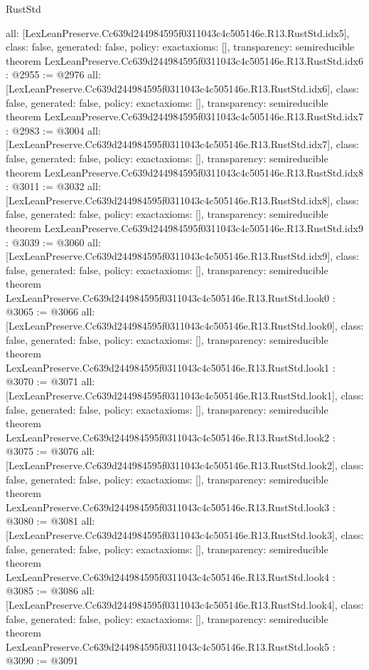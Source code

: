 \begin{lexlean}{RustStd}
\begin{coremodule}
{  all: [LexLeanPreserve.Cc639d244984595f0311043c4c505146e.R13.RustStd.idx5],
  class: false,
  generated: false,
  policy: exact{axioms: []},
  transparency: semireducible
}
theorem LexLeanPreserve.Cc639d244984595f0311043c4c505146e.R13.RustStd.idx6 : @2955 := @2976 {
  all: [LexLeanPreserve.Cc639d244984595f0311043c4c505146e.R13.RustStd.idx6],
  class: false,
  generated: false,
  policy: exact{axioms: []},
  transparency: semireducible
}
theorem LexLeanPreserve.Cc639d244984595f0311043c4c505146e.R13.RustStd.idx7 : @2983 := @3004 {
  all: [LexLeanPreserve.Cc639d244984595f0311043c4c505146e.R13.RustStd.idx7],
  class: false,
  generated: false,
  policy: exact{axioms: []},
  transparency: semireducible
}
theorem LexLeanPreserve.Cc639d244984595f0311043c4c505146e.R13.RustStd.idx8 : @3011 := @3032 {
  all: [LexLeanPreserve.Cc639d244984595f0311043c4c505146e.R13.RustStd.idx8],
  class: false,
  generated: false,
  policy: exact{axioms: []},
  transparency: semireducible
}
theorem LexLeanPreserve.Cc639d244984595f0311043c4c505146e.R13.RustStd.idx9 : @3039 := @3060 {
  all: [LexLeanPreserve.Cc639d244984595f0311043c4c505146e.R13.RustStd.idx9],
  class: false,
  generated: false,
  policy: exact{axioms: []},
  transparency: semireducible
}
theorem LexLeanPreserve.Cc639d244984595f0311043c4c505146e.R13.RustStd.look0 : @3065 := @3066 {
  all: [LexLeanPreserve.Cc639d244984595f0311043c4c505146e.R13.RustStd.look0],
  class: false,
  generated: false,
  policy: exact{axioms: []},
  transparency: semireducible
}
theorem LexLeanPreserve.Cc639d244984595f0311043c4c505146e.R13.RustStd.look1 : @3070 := @3071 {
  all: [LexLeanPreserve.Cc639d244984595f0311043c4c505146e.R13.RustStd.look1],
  class: false,
  generated: false,
  policy: exact{axioms: []},
  transparency: semireducible
}
theorem LexLeanPreserve.Cc639d244984595f0311043c4c505146e.R13.RustStd.look2 : @3075 := @3076 {
  all: [LexLeanPreserve.Cc639d244984595f0311043c4c505146e.R13.RustStd.look2],
  class: false,
  generated: false,
  policy: exact{axioms: []},
  transparency: semireducible
}
theorem LexLeanPreserve.Cc639d244984595f0311043c4c505146e.R13.RustStd.look3 : @3080 := @3081 {
  all: [LexLeanPreserve.Cc639d244984595f0311043c4c505146e.R13.RustStd.look3],
  class: false,
  generated: false,
  policy: exact{axioms: []},
  transparency: semireducible
}
theorem LexLeanPreserve.Cc639d244984595f0311043c4c505146e.R13.RustStd.look4 : @3085 := @3086 {
  all: [LexLeanPreserve.Cc639d244984595f0311043c4c505146e.R13.RustStd.look4],
  class: false,
  generated: false,
  policy: exact{axioms: []},
  transparency: semireducible
}
theorem LexLeanPreserve.Cc639d244984595f0311043c4c505146e.R13.RustStd.look5 : @3090 := @3091 {
}
\end{coremodule}
\end{lexlean}
